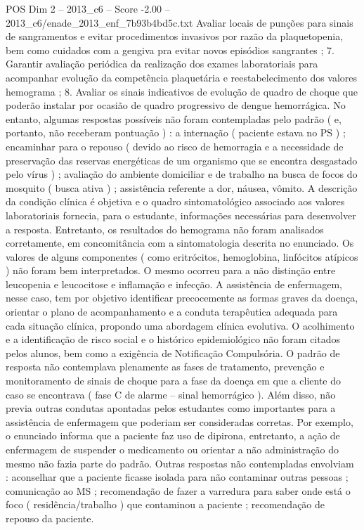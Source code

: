 \begin{textsample}{POS Dim 2 – 2013\_c6 – Score -2.00 – 2013\_c6/enade\_2013\_enf\_7b93b4bd5c.txt}
Avaliar locais de punções para sinais de sangramentos e evitar procedimentos invasivos por razão da plaquetopenia, bem como cuidados com a gengiva pra evitar novos episódios sangrantes ; 7.
Garantir avaliação periódica da realização dos exames laboratoriais para acompanhar evolução da competência plaquetária e reestabelecimento dos valores hemograma ; 8.
Avaliar os sinais indicativos de evolução de quadro de choque que poderão instalar por ocasião de quadro progressivo de dengue hemorrágica.
No entanto, algumas respostas possíveis não foram contempladas pelo padrão ( e, portanto, não receberam pontuação ) : a internação ( paciente estava no PS ) ; encaminhar para o repouso ( devido ao risco de hemorragia e a necessidade de preservação das reservas energéticas de um organismo que se encontra desgastado pelo vírus ) ; avaliação do ambiente domiciliar e de trabalho na busca de focos do mosquito ( busca ativa ) ; assistência referente a dor, náusea, vômito.
A descrição da condição clínica é objetiva e o quadro sintomatológico associado aos valores laboratoriais fornecia, para o estudante, informações necessárias para desenvolver a resposta.
Entretanto, os resultados do hemograma não foram analisados corretamente, em concomitância com a sintomatologia descrita no enunciado.
Os valores de alguns componentes ( como eritrócitos, hemoglobina, linfócitos atípicos ) não foram bem interpretados.
O mesmo ocorreu para a não distinção entre leucopenia e leucocitose e inflamação e infecção.
A assistência de enfermagem, nesse caso, tem por objetivo identificar precocemente as formas graves da doença, orientar o plano de acompanhamento e a conduta terapêutica adequada para cada situação clínica, propondo uma abordagem clínica evolutiva.
O acolhimento e a identificação de risco social e o histórico epidemiológico não foram citados pelos alunos, bem como a exigência de Notificação Compulsória.
O padrão de resposta não contemplava plenamente as fases de tratamento, prevenção e monitoramento de sinais de choque para a fase da doença em que a cliente do caso se encontrava ( fase C de alarme – sinal hemorrágico ).
Além disso, não previa outras condutas apontadas pelos estudantes como importantes para a assistência de enfermagem que poderiam ser consideradas corretas.
Por exemplo, o enunciado informa que a paciente faz uso de dipirona, entretanto, a ação de enfermagem de suspender o medicamento ou orientar a não administração do mesmo não fazia parte do padrão.
Outras respostas não contempladas envolviam : aconselhar que a paciente ficasse isolada para não contaminar outras pessoas ; comunicação ao MS ; recomendação de fazer a varredura para saber onde está o foco ( residência/trabalho ) que contaminou a paciente ; recomendação de repouso da paciente.

\end{textsample}
